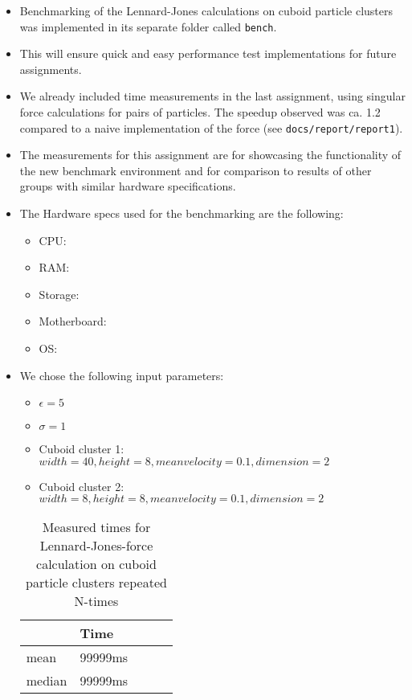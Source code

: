 \documentclass{article}
\begin{document}
\begin{itemize}
    \item Benchmarking of the Lennard-Jones calculations on cuboid particle clusters was implemented in its separate folder called \texttt{bench}.
    \item This will ensure quick and easy performance test implementations for future assignments.
    \item We already included time measurements in the last assignment, using singular force calculations for pairs of particles. The speedup observed was ca. 1.2 compared to a naive implementation of the force (see \texttt{docs/report/report1}).
    \item The measurements for this assignment are for showcasing the functionality of the new benchmark environment and for comparison to results of other groups with similar hardware specifications.
    \item The Hardware specs used for the benchmarking are the following:
    \begin{itemize}
        \item CPU:
        \item RAM:
        \item Storage:
        \item Motherboard:
        \item OS:
    \end{itemize}
    \item We chose the following input parameters:
    \begin{itemize}
        \item $\epsilon = 5$
        \item $\sigma = 1$
        \item Cuboid cluster 1: $width = 40, height = 8, mean velocity = 0.1, dimension = 2$
        \item Cuboid cluster 2: $width = 8, height = 8, mean velocity = 0.1, dimension = 2$
    \end{itemize}
    \begin{table}[H]
        \centering
        \begin{tabular}{|l|l|l|l|l|}
            \hline
            & Time \\ \hline
            mean & 99999ms                  \\ \hline
            median & 99999ms                  \\ \hline
        \end{tabular}
        \caption{Measured times for Lennard-Jones-force calculation on cuboid particle clusters repeated N-times}
        \label{tab:benchmark}
    \end{table}
\end{itemize}
\end{document}
